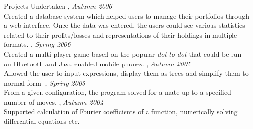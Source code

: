 \documentclass[final]{resume}
\begin{document}
\begin{category}{Projects Undertaken}
, \emph{Autumn 2006}\\
Created a database system which helped users to manage their portfolios through a web interface. Once the data was entered, the users could see various statistics related to their profits/losses and representations of their holdings in multiple formats.
, \emph{Spring 2006}\\
Created a multi-player game based on the popular \emph{dot-to-dot} that could be run on Bluetooth and Java enabled mobile phones.
, \emph{Autumn 2005}\\
Allowed the user to input expressions, display them as trees and simplify them to normal form.
, \emph{Spring 2005}\\
From a given configuration, the program solved for a mate up to a specified number of moves.
, \emph{Autumn 2004}\\
Supported calculation of Fourier coefficients of a function, numerically solving differential equations etc.
\end{category}


% 
\end{document}
